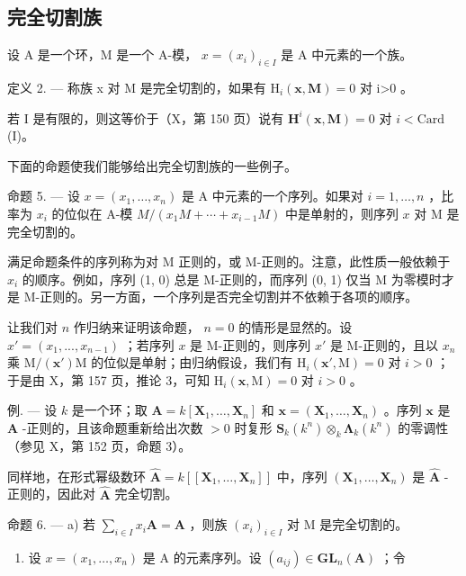 \subsection{完全切割族}

设 A 是一个环，M 是一个 A-模， \(x = (x_{i})_{i \in I}\) 是 A 中元素的一个族。

定义 2. --- 称族 x 对 M 是完全切割的，如果有 \(\mathrm{H}_{i}(\mathbf{x},\mathbf{M})=0\) 对 i\textgreater0 。

若 I 是有限的，则这等价于（X，第 150 页）说有 \(\mathbf{H}^i (\pmb {x},\mathbf{M}) = 0\) 对 \(i <   \mathrm{Card}\) (I)。

下面的命题使我们能够给出完全切割族的一些例子。

命题 5. --- 设 \(x = (x_1, \ldots, x_n)\) 是 A 中元素的一个序列。如果对 \(i=1, \ldots, n\) ，比率为 \(x_i\) 的位似在 A-模 \(M/(x_1 M + \cdots + x_{i-1} M)\) 中是单射的，则序列 \(x\) 对 M 是完全切割的。

满足命题条件的序列称为对 M 正则的，或 M-正则的。注意，此性质一般依赖于 \(x_i\) 的顺序。例如，序列 (1, 0) 总是 M-正则的，而序列 (0, 1) 仅当 M 为零模时才是 M-正则的。另一方面，一个序列是否完全切割并不依赖于各项的顺序。

让我们对 \(n\) 作归纳来证明该命题， \(n=0\) 的情形是显然的。设 \(x'=(x_{1},...,x_{n-1})\) ；若序列 \(x\) 是 M-正则的，则序列 \(x'\) 是 M-正则的，且以 \(x_{n}\) 乘 \(\mathrm{M}/(\mathbf{x}')\mathrm{M}\) 的位似是单射；由归纳假设，我们有 \(\mathrm{H}_{i}(\mathbf{x}',\mathrm{M})=0\) 对 \(i>0\) ；于是由 X，第 157 页，推论 3，可知 \(\mathrm{H}_{i}(\mathbf{x},\mathrm{M})=0\) 对 \(i>0\) 。

例. --- 设 \(k\) 是一个环；取 \(\mathbf{A} = k[\mathbf{X}_1, \ldots, \mathbf{X}_n]\) 和 \(\boldsymbol{x} = (\mathbf{X}_1, \ldots, \mathbf{X}_n)\) 。序列 \(\boldsymbol{x}\) 是 \(\mathbf{A}\) -正则的，且该命题重新给出次数 \(>0\) 时复形 \(\mathbf{S}_k(k^n) \otimes_k \boldsymbol{\Lambda}_k(k^n)\) 的零调性（参见 X，第 152 页，命题 3）。

同样地，在形式幂级数环 \(\hat{\mathbf{A}} = k[[\mathbf{X}_1, \ldots, \mathbf{X}_n]]\) 中，序列 \((\mathbf{X}_1, \ldots, \mathbf{X}_n)\) 是 \(\hat{\mathbf{A}}\) -正则的，因此对 \(\hat{\mathbf{A}}\) 完全切割。

命题 6. --- a) 若 \(\sum_{i\in I}x_i\mathbf{A} = \mathbf{A}\) ，则族 \((x_i)_{i\in I}\) 对 M 是完全切割的。

\begin{enumerate}
\def\labelenumi{\alph{enumi})}
\setcounter{enumi}{1}
\tightlist
\item
  设 \(x = (x_1, \ldots, x_n)\) 是 A 的元素序列。设 \((a_{ij}) \in \mathbf{GL}_n(\mathbf{A})\) ；令
\end{enumerate}

